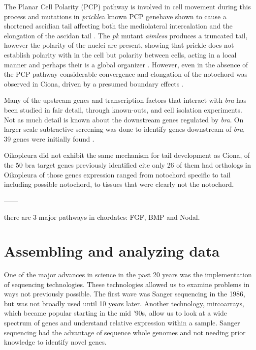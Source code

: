 The Planar Cell Polarity (PCP) pathway is involved in cell movement during this process and mutations in \textit{prickle}\textemdash a known PCP gene\textemdash have shown to cause a shortened ascidian tail affecting both the mediolateral intercalation and the elongation of the ascidan tail \cite{jiang_ascidian_2005}. The \textit{pk} mutant \textit{aimless} produces a truncated tail, however the polarity of the nuclei are present, showing that prickle does not establish polarity with in the cell but polarity between cells, acting in a local manner and perhaps their is a global organizer \cite{jiang_ascidian_2005,kourakis_one-dimensional_2014}. However, even in the absence of the PCP pathway considerable convergence and elongation of the notochord was observed in Ciona, driven by a presumed boundary effects \cite{veeman_chongmague_2008}.

Many of the upstream genes and transcription factors that interact with \textit{bra} has been studied in fair detail, through known-outs, and cell isolation experiments. Not as much detail is known about the downstream genes regulated by \textit{bra}. On larger scale subtractive screening was done to identify genes downstream of \textit{bra}, 39 genes were initially found \cite{hotta_temporal_1999}. 

Oikopleura did not exhibit the same mechanism for tail development as Ciona, of the 50 bra target genes previously identified cite only 26 of them had orthologs in Oikopleura \cite{kugler_evolutionary_2011} of those genes expression ranged from notochord specific to tail including possible notochord, to tissues that were clearly not the notochord.

------


there are 3 major pathways in chordates: FGF, BMP and Nodal.


\section{Assembling and analyzing data}
One of the major advances in science in the past 20 years was the implementation of sequencing technologies. These technologies allowed us to examine problems in ways not previously possible. The first wave was Sanger sequencing in the 1986, but was not broadly used until 10 years later. Another technology, mircoarrays, which became popular starting in the mid '90s, allow us to look at a wide spectrum of genes and understand relative expression within a sample. Sanger sequencing had the advantage of sequence whole genomes and not needing prior knowledge to identify novel genes.

